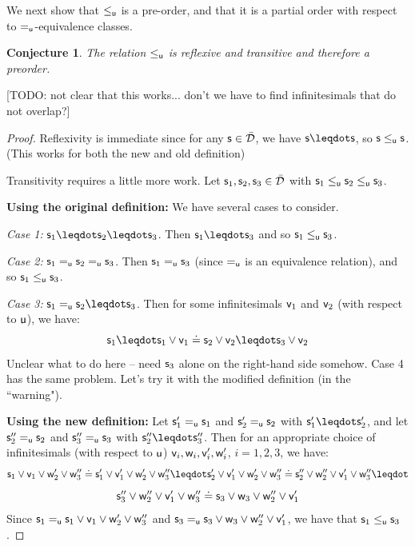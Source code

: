 \documentclass[10pt, onecolumn, nofootinbib]{revtex4-2}
\newtheorem{conj}[equation]{Conjecture}
\begin{document}
We next show that $\lequ$ is a pre-order, and that it is a partial order with respect to $\equ$-equivalence classes. 

\begin{conj}
	The relation $\lequ$ is reflexive and transitive and therefore a preorder.
\end{conj}

[TODO: not clear that this works... don't we have to find infinitesimals that do not overlap?]
\begin{proof}
	Reflexivity is immediate since for any $\stmt\in\tdomain$, we have $\stmt\finer\stmt$, so $\stmt\lequ\stmt$. (This works for both the new and old definition)
	
	Transitivity requires a little more work. Let $\stmt_1,\stmt_2,\stmt_3\in\tdomain$ with $\stmt_1\lequ\stmt_2\lequ\stmt_3$. 
	
	{\bf Using the original definition:}
	We have several cases to consider. 
	
	\emph{Case 1:} $\stmt_1\finer\stmt_2\finer\stmt_3$. Then $\stmt_1\finer\stmt_3$ and so $\stmt_1\lequ\stmt_3$. 
	
	\emph{Case 2:} $\stmt_1\equ\stmt_2\equ\stmt_3$. Then $\stmt_1\equ\stmt_3$ (since $\equ$ is an equivalence relation), and so $\stmt_1\lequ\stmt_3$. 
	
	\emph{Case 3:} $\stmt_1\equ\stmt_2\finer\stmt_3$. Then for some infinitesimals $\stmt[v]_1$ and $\stmt[v]_2$ (with respect to $\stmt[u]$), we have:
	$$
	\stmt_1\finer\stmt_1\OR\stmt[v]_1\eqgran\stmt_2\OR\stmt[v]_2\finer\stmt_3\OR\stmt[v]_2
	$$
	Unclear what to do here -- need $\stmt_3$ alone on the right-hand side somehow. Case 4 has the same problem. Let's try it with the modified definition (in the ``warning").
	
	{\bf Using the new definition:}
	Let $\stmt_1'\equ\stmt_1$ and $\stmt_2'\equ\stmt_2$ with $\stmt_1'\finer\stmt_2'$, and let $\stmt_2''\equ\stmt_2$ and $\stmt_3''\equ\stmt_3$ with $\stmt_2''\finer\stmt_3''$. 
	Then for an appropriate choice of infinitesimals (with respect to $\stmt[u]$) $\stmt[v]_i,\stmt[w]_i,\stmt[v]_i',\stmt[w]_i'$, $i=1,2,3$, we have:
	$$
	\stmt_1\OR\stmt[v]_1\OR\stmt[w]_2'\OR\stmt[w]_3'' \eqgran \stmt_1'\OR\stmt[v]_1'\OR\stmt[w]_2'\OR\stmt[w]_3'' \finer \stmt_2'\OR\stmt[v]_1'\OR\stmt[w]_2'\OR\stmt[w]_3'' \eqgran \stmt_2''\OR\stmt[w]_2''\OR\stmt[v]_1'\OR\stmt[w]_3'' \finer
	$$
	$$
	\stmt_3''\OR\stmt[w]_2''\OR\stmt[v]_1'\OR\stmt[w]_3'' \eqgran
	\stmt_3\OR\stmt[w]_3 \OR\stmt[w]_2''\OR\stmt[v]_1'
	$$
	Since $\stmt_1 \equ \stmt_1\OR\stmt[v]_1\OR\stmt[w]_2'\OR\stmt[w]_3''$ and $\stmt_3 \equ \stmt_3\OR\stmt[w]_3 \OR\stmt[w]_2''\OR\stmt[v]_1' $, we have that $\stmt_1\lequ\stmt_3$. 
	
\end{proof}
\end{document}
